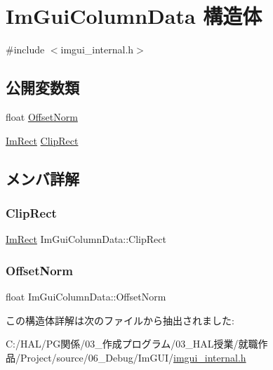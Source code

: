 \hypertarget{struct_im_gui_column_data}{}\section{Im\+Gui\+Column\+Data 構造体}
\label{struct_im_gui_column_data}


{\ttfamily \#include $<$imgui\+\_\+internal.\+h$>$}

\subsection*{公開変数類}
\begin{DoxyCompactItemize}
\item 
float \mbox{\hyperlink{struct_im_gui_column_data_a9678a00f55c9fa44ed35ec14ea9b697b}{Offset\+Norm}}
\item 
\mbox{\hyperlink{struct_im_rect}{Im\+Rect}} \mbox{\hyperlink{struct_im_gui_column_data_aeccf8bbbd380fdd9d3350b5aac95ad34}{Clip\+Rect}}
\end{DoxyCompactItemize}


\subsection{メンバ詳解}
\mbox{\label{struct_im_gui_column_data_aeccf8bbbd380fdd9d3350b5aac95ad34}} 
\subsubsection{\texorpdfstring{Clip\+Rect}{ClipRect}}
{\footnotesize\ttfamily \mbox{\hyperlink{struct_im_rect}{Im\+Rect}} Im\+Gui\+Column\+Data\+::\+Clip\+Rect}

\mbox{\label{struct_im_gui_column_data_a9678a00f55c9fa44ed35ec14ea9b697b}} 
\subsubsection{\texorpdfstring{Offset\+Norm}{OffsetNorm}}
{\footnotesize\ttfamily float Im\+Gui\+Column\+Data\+::\+Offset\+Norm}



この構造体詳解は次のファイルから抽出されました\+:\begin{DoxyCompactItemize}
\item 
C\+:/\+H\+A\+L/\+P\+G関係/03\+\_\+作成プログラム/03\+\_\+\+H\+A\+L授業/就職作品/\+Project/source/06\+\_\+\+Debug/\+Im\+G\+U\+I/\mbox{\hyperlink{imgui__internal_8h}{imgui\+\_\+internal.\+h}}\end{DoxyCompactItemize}
